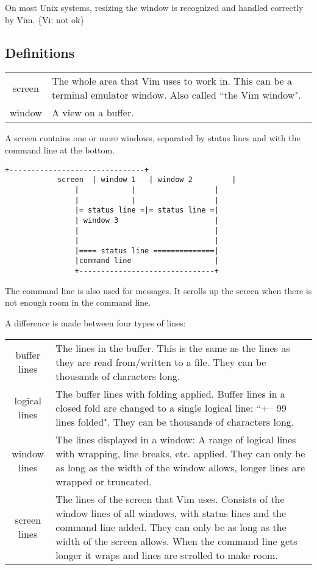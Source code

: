 On most Unix systems, resizing the window is recognized and handled correctly by Vim.
\{Vi: not ok\}

\subsection{Definitions}
\label{definitions}
\begin{tabularx}{\textwidth}{c X}
				screen & The whole area that Vim uses to work in.
				This can be a terminal emulator window.
				Also called ``the Vim window". \\
				window & A view on a buffer.
\end{tabularx}

A screen contains one or more windows, separated by status lines and with the command line at the bottom.

\begin{Verbatim}[samepage=true] 
				+-------------------------------+
			screen  | window 1   | window 2         |
				|            |                  |
				|            |                  |
				|= status line =|= status line =|
				| window 3                      |
				|                               |
				|                               |
				|==== status line ==============|
				|command line                   |
				+-------------------------------+
\end{Verbatim}

The command line is also used for messages.
It scrolls up the screen when there is not enough room in the command line.

A difference is made between four types of lines:

\begin{center}
				\begin{tabularx}{\textwidth}{c X}
								buffer lines & 
								The lines in the buffer.
								This is the same as the lines as they are read from/written to a file.
								They can be thousands of characters long. \\

								logical lines & 
								The buffer lines with folding applied.
								Buffer lines in a closed fold are changed to a single logical line: ``+-- 99 lines folded".
								They can be thousands of characters long.\\

								window lines & 
								The lines displayed in a window: A range of logical lines with wrapping, line breaks, etc.  applied.
								They can only be as long as the width of the window allows, longer lines are wrapped or truncated.\\

								screen lines & 
								The lines of the screen that Vim uses.
								Consists of the window lines of all windows, with status lines and the command line added.
								They can only be as long as the width of the screen allows.
								When the command line gets longer it wraps and lines are scrolled to make room.
				\end{tabularx}
\end{center}

